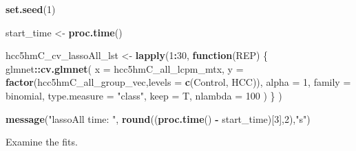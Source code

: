 \documentclass[
]{book}
\newenvironment{Shaded}{\begin{snugshade}}{\end{snugshade}}
\newcommand{\CommentTok}[1]{\textcolor[rgb]{0.56,0.35,0.01}{\textit{#1}}}
\newcommand{\ControlFlowTok}[1]{\textcolor[rgb]{0.13,0.29,0.53}{\textbf{#1}}}
\newcommand{\DataTypeTok}[1]{\textcolor[rgb]{0.13,0.29,0.53}{#1}}
\newcommand{\DecValTok}[1]{\textcolor[rgb]{0.00,0.00,0.81}{#1}}
\newcommand{\FloatTok}[1]{\textcolor[rgb]{0.00,0.00,0.81}{#1}}
\newcommand{\KeywordTok}[1]{\textcolor[rgb]{0.13,0.29,0.53}{\textbf{#1}}}
\newcommand{\NormalTok}[1]{#1}
\newcommand{\OperatorTok}[1]{\textcolor[rgb]{0.81,0.36,0.00}{\textbf{#1}}}
\newcommand{\StringTok}[1]{\textcolor[rgb]{0.31,0.60,0.02}{#1}}
\begin{document}
\begin{Shaded}
\begin{Highlighting}[]
\KeywordTok{set.seed}\NormalTok{(}\DecValTok{1}\NormalTok{)}

\NormalTok{start\_time <{-}}\StringTok{  }\KeywordTok{proc.time}\NormalTok{()}

\NormalTok{hcc5hmC\_cv\_lassoAll\_lst <{-}}\StringTok{ }\KeywordTok{lapply}\NormalTok{(}\DecValTok{1}\OperatorTok{:}\DecValTok{30}\NormalTok{, }\ControlFlowTok{function}\NormalTok{(REP) \{}
\NormalTok{glmnet}\OperatorTok{::}\KeywordTok{cv.glmnet}\NormalTok{(}
 \DataTypeTok{x =}\NormalTok{ hcc5hmC\_all\_lcpm\_mtx,}
 \DataTypeTok{y =} \KeywordTok{factor}\NormalTok{(hcc5hmC\_all\_group\_vec,}\DataTypeTok{levels =} \KeywordTok{c}\NormalTok{(}\StringTok{\textquotesingle{}Control\textquotesingle{}}\NormalTok{, }\StringTok{\textquotesingle{}HCC\textquotesingle{}}\NormalTok{)),}
 \DataTypeTok{alpha =} \DecValTok{1}\NormalTok{,}
 \DataTypeTok{family =} \StringTok{\textquotesingle{}binomial\textquotesingle{}}\NormalTok{,}
 \DataTypeTok{type.measure  =}  \StringTok{"class"}\NormalTok{,}
 \DataTypeTok{keep =}\NormalTok{ T,}
 \DataTypeTok{nlambda =} \DecValTok{100}
\NormalTok{)}
\NormalTok{\}}
\NormalTok{)}

\KeywordTok{message}\NormalTok{(}\StringTok{"lassoAll time: "}\NormalTok{, }\KeywordTok{round}\NormalTok{((}\KeywordTok{proc.time}\NormalTok{() }\OperatorTok{{-}}\StringTok{ }\NormalTok{start\_time)[}\DecValTok{3}\NormalTok{],}\DecValTok{2}\NormalTok{),}\StringTok{"s"}\NormalTok{)}
\end{Highlighting}
\end{Shaded}

Examine the fits.

\begin{Shaded}
\end{Shaded}
\end{document}
